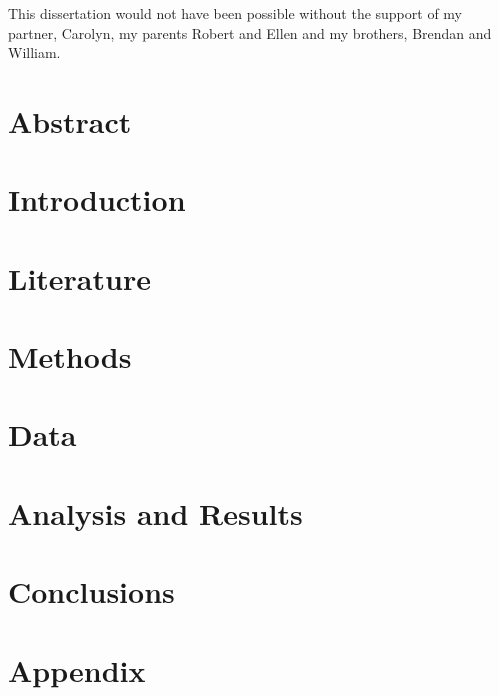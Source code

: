 \documentclass[hidelinks,11pt]{article} %
\begin{document}
This dissertation would not have been possible without the support of my partner, Carolyn, my parents Robert and Ellen and my brothers, Brendan and William. 
%
%
\pagebreak

\section{Abstract} \label{abstract}


\pagebreak

\tableofcontents
\pagebreak

\listoffigures
\listoftables
\pagebreak

\section{Introduction} \label{introduction}

	

\section{Literature} \label{literature}

	

\section{Methods} \label{methods}

	


\section{Data} \label{data} 

	

\section{Analysis and Results}\label{analysis}

	


\section{Conclusions} \label{conclusions}

	


\pagebreak

\section{Appendix}



\pagebreak

\printbibliography
\end{document}
